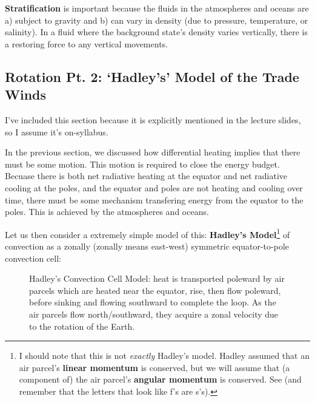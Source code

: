 \textbf{Stratification} is important because the fluids in the atmospheres and oceans are a) subject to gravity and b) can vary in density (due to pressure, temperature, or salinity). In a fluid where the background state's density varies vertically, there is a restoring force to any vertical movements.

\subsection{Rotation Pt. 2: `Hadley's' Model of the Trade Winds}

I've included this section because it is explicitly mentioned in the lecture slides, so I assume it's on-syllabus.

In the previous section, we discussed how differential heating implies that there must be some motion. This motion is required to close the energy budget. Becuase there is both net radiative heating at the equator and net radiative cooling at the poles, and the equator and poles are not heating and cooling over time, there must be some mechanism transfering energy from the equator to the poles. This is achieved by the atmospheres and oceans.

Let us then consider a extremely simple model of this: \textbf{Hadley's Model}\footnote{
    I should note that this is not \textit{exactly} Hadley's model. Hadley assumed that an air parcel's \textbf{linear momentum} is conserved, but we will assume that (a component of) the air parcel's \textbf{angular momentum} is conserved. See \cite{Hadley_Model} (and remember that the letters that look like f's are s's).
} of convection as a zonally (zonally means east-west) symmetric equator-to-pole convection cell:
\begin{figure}[H]
    \centering
    \caption{Hadley's Convection Cell Model: heat is transported poleward by air parcels which are heated near the equator, rise, then flow poleward, before sinking and flowing southward to complete the loop. As the air parcels flow north/southward, they acquire a zonal velocity due to the rotation of the Earth.}
\end{figure}

